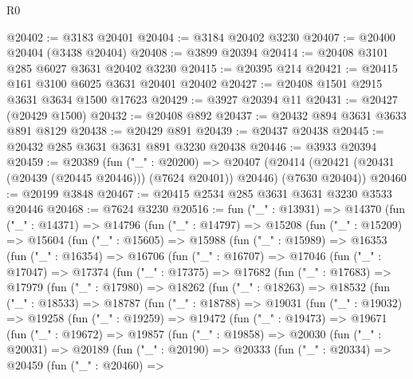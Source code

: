 \begin{lexlean}{R0}
\begin{coremodule}
@20402 := @3183 @20401
@20404 := @3184 @20402 @3230
@20407 := @20400 @20404 (@3438 @20404)
@20408 := @3899 @20394
@20414 := @20408 @3101 @285 @6027 @3631 @20402 @3230
@20415 := @20395 @214
@20421 := @20415 @161 @3100 @6025 @3631 @20401 @20402
@20427 := @20408 @1501 @2915 @3631 @3634 @1500 @17623
@20429 := @3927 @20394 @11
@20431 := @20427 (@20429 @1500)
@20432 := @20408 @892
@20437 := @20432 @894 @3631 @3633 @891 @8129
@20438 := @20429 @891
@20439 := @20437 @20438
@20445 := @20432 @285 @3631 @3631 @891 @3230 @20438
@20446 := @3933 @20394
@20459 := @20389
    (fun ("_" : @20200) =>
    @20407 (@20414 (@20421 (@20431 (@20439 (@20445 @20446))) (@7624 @20401)) @20446) (@7630 @20404))
@20460 := @20199 @3848
@20467 := @20415 @2534 @285 @3631 @3631 @3230 @3533 @20446
@20468 := @7624 @3230
@20516 := fun ("_" : @13931) =>
  @14370
    (fun ("_" : @14371) =>
    @14796
      (fun ("_" : @14797) =>
      @15208
        (fun ("_" : @15209) =>
        @15604
          (fun ("_" : @15605) =>
          @15988
            (fun ("_" : @15989) =>
            @16353
              (fun ("_" : @16354) =>
              @16706
                (fun ("_" : @16707) =>
                @17046
                  (fun ("_" : @17047) =>
                  @17374
                    (fun ("_" : @17375) =>
                    @17682
                      (fun ("_" : @17683) =>
                      @17979
                        (fun ("_" : @17980) =>
                        @18262
                          (fun ("_" : @18263) =>
                          @18532
                            (fun ("_" : @18533) =>
                            @18787
                              (fun ("_" : @18788) =>
                              @19031
                                (fun ("_" : @19032) =>
                                @19258
                                  (fun ("_" : @19259) =>
                                  @19472
                                    (fun ("_" : @19473) =>
                                    @19671
                                      (fun ("_" : @19672) =>
                                      @19857
                                        (fun ("_" : @19858) =>
                                        @20030
                                          (fun ("_" : @20031) =>
                                          @20189
                                            (fun ("_" : @20190) =>
                                            @20333
                                              (fun ("_" : @20334) =>
                                              @20459
                                                (fun ("_" : @20460) =>

\end{coremodule}
\end{lexlean}
